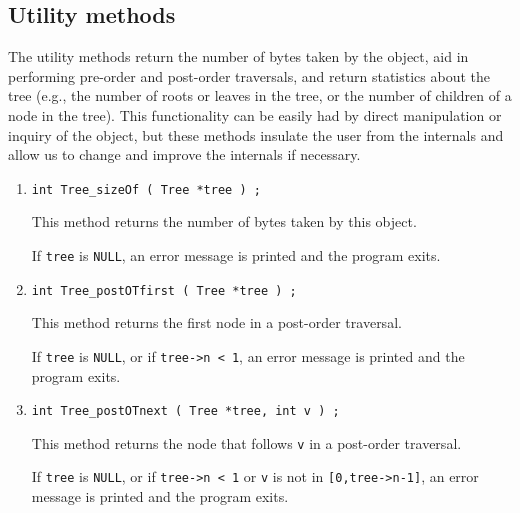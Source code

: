 \subsection{Utility methods}
\label{subsection:Tree:proto:utilities}
\par
The utility methods return the number of bytes taken by the object,
aid in performing pre-order and post-order traversals, and return
statistics about the tree (e.g.,
the number of roots or leaves in the tree, or the number of
children of a node in the tree).
This functionality can be easily had by direct manipulation or
inquiry of the object, but these methods insulate the user from the
internals and allow us to change and improve the internals if
necessary.
\par
\begin{enumerate}
\item
\begin{verbatim}
int Tree_sizeOf ( Tree *tree ) ;
\end{verbatim}
This method returns the number of bytes taken by this object.
\par {}
If {\tt tree} is {\tt NULL},
an error message is printed and the program exits.
\item
\begin{verbatim}
int Tree_postOTfirst ( Tree *tree ) ;
\end{verbatim}
This method returns the first node in a post-order traversal.
\par {}
If {\tt tree} is {\tt NULL}, 
or if {\tt tree->n < 1}, 
an error message is printed and the program exits.
\item
\begin{verbatim}
int Tree_postOTnext ( Tree *tree, int v ) ;
\end{verbatim}
This method returns the node that follows {\tt v}
in a post-order traversal.
\par {}
If {\tt tree} is {\tt NULL}, 
or if {\tt tree->n < 1} 
or {\tt v} is not in {\tt [0,tree->n-1]},
an error message is printed and the program exits.

\end{enumerate}
